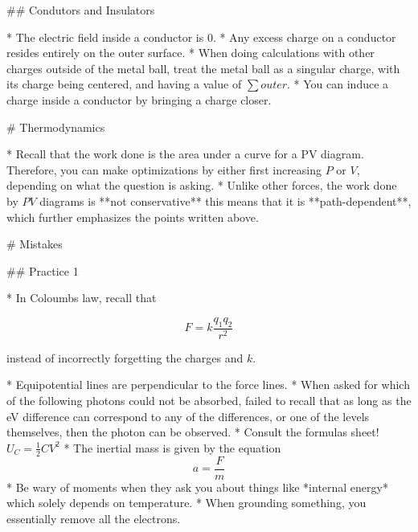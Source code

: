 \documentclass{article}
\begin{document}
\begin{markdown}
## Condutors and Insulators

* The electric field inside a conductor is $0$.
* Any excess charge on a conductor resides entirely on the outer surface.
* When doing calculations with other charges outside of the metal ball, treat the metal ball as a singular charge, with its charge being centered, and having a value of $\sum outer$.
* You can induce a charge inside a conductor by bringing a charge closer. 

# Thermodynamics

* Recall that the work done is the area under a curve for a PV diagram. Therefore, you can make optimizations by either first increasing $P$ or $V$, depending on what the question is asking.
* Unlike other forces, the work done by $PV$ diagrams is **not conservative** this means that it is **path-dependent**, which further emphasizes the points written above.

# Mistakes

## Practice 1

* In Coloumbs law, recall that

\end{markdown}

$$
F = k\frac{q_1 q_2}{r^2}
$$

\begin{markdown}

instead of incorrectly forgetting the charges and $k$.

* Equipotential lines are perpendicular to the force lines.
* When asked for which of the following photons could not be absorbed, failed to recall that as long as the eV difference can correspond to any of the differences, or one of the levels themselves, then the photon can be observed.
* Consult the formulas sheet! $U_C = \frac{1}{2}CV^2$
* The inertial mass is given by the equation $$a = \frac{F}{m}$$
* Be wary of moments when they ask you about things like *internal energy* which solely depends on temperature.
* When grounding something, you essentially remove all the electrons.

\end{markdown}
\end{document}
